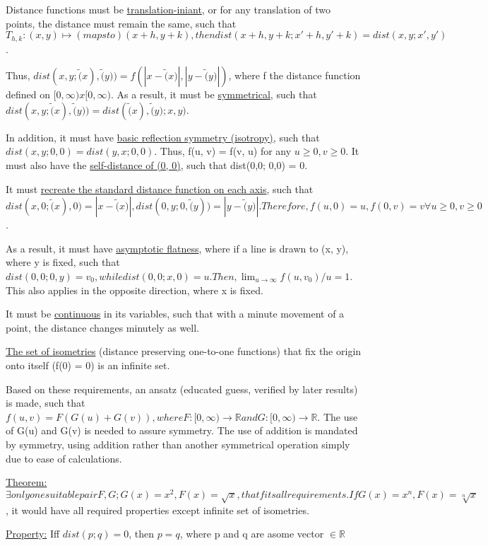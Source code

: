 \documentclass[11 pt, twoside]{article}
\begin{document}
Distance functions must be \underline{translation-iniant}, or for any translation of two points, the distance must remain the same, such that $T_{h, k}: (x, y) \mapsto (maps to) (x+h, y+k), then dist(x+h, y+k; x'+h, y'+k) = dist(x, y; x', y')$. 

Thus, $dist(x,y; \tilde(x), \tilde(y)) = f(|x-\tilde(x)|, |y-\tilde(y)|)$, where f the distance function defined on $[0, \infty) x [0, \infty).$ As a result, it must be \underline{symmetrical}, such that $dist(x, y; \tilde(x), \tilde(y)) = dist(\tilde(x), \tilde(y); x, y)$.

In addition, it must have \underline{basic reflection symmetry (isotropy)}, such that $dist(x, y; 0, 0) = dist(y, x; 0, 0)$. Thus, f(u, v) = f(v, u) for any $u \geq 0, v \geq 0$. It must also have the \underline{self-distance of (0, 0)}, such that dist(0,0; 0,0) = 0.

It must \underline{recreate the standard distance function on each axis}, such that $dist(x,0; \tilde(x), 0) = |x - \tilde(x)|, dist(0, y; 0, \tilde(y)) = |y - \tilde(y)|. Therefore, f(u, 0) = u, f(0, v) = v \forall u \geq 0, v \geq 0$.

As a result, it must have \underline{asymptotic flatness}, where if a line is drawn to (x, y), where y is fixed, such that $dist(0,0; 0, y) = v_0, while dist(0, 0; x, 0) = u. Then, \lim_{u \to \infty} f(u, v_0)/u = 1$. This also applies in the opposite direction, where x is fixed.

It must be \underline{continuous} in its variables, such that with a minute movement of a point, the distance changes minutely as well.

\underline{The set of isometries} (distance preserving one-to-one functions) that fix the origin onto itself (f(0) = 0) is an infinite set.

Based on these requirements, an ansatz (educated guess, verified by later results) is made, such that $f(u, v) = F(G(u) + G(v)), where F: [0, \infty) \to \mathbb{R} and G: [0, \infty) \to \mathbb{R}$. The use of G(u) and G(v) is needed to assure symmetry. The use of addition is mandated by symmetry, using addition rather than another symmetrical operation simply due to ease of calculations.

\underline{Theorem:} $\exists only one suitable pair F, G; G(x) = x^2, F(x) = \sqrt{x}, that fits all requirements. If G(x) = x^n, F(x) = \sqrt[n]{x}$, it would have all required properties except infinite set of isometries.

\underline{Property:} Iff $dist(p; q) = 0$, then $p = q$, where p and q are asome vector $\in \mathbb{R}$
\end{document}
